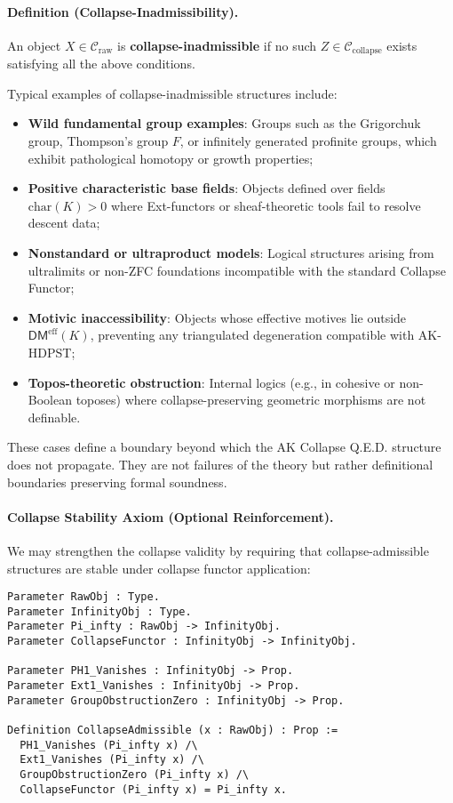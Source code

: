\documentclass[11pt]{article}
\begin{document}
\paragraph{Definition (Collapse-Inadmissibility).}

An object \( X \in \mathcal{C}_{\mathrm{raw}} \) is \textbf{collapse-inadmissible} if no such \( Z \in \mathcal{C}_{\mathrm{collapse}} \) exists satisfying all the above conditions.

Typical examples of collapse-inadmissible structures include:

\begin{itemize}
  \item \textbf{Wild fundamental group examples}: Groups such as the Grigorchuk group, Thompson’s group \( F \), or infinitely generated profinite groups, which exhibit pathological homotopy or growth properties;
  \item \textbf{Positive characteristic base fields}: Objects defined over fields \( \mathrm{char}(K) > 0 \) where Ext-functors or sheaf-theoretic tools fail to resolve descent data;
  \item \textbf{Nonstandard or ultraproduct models}: Logical structures arising from ultralimits or non-ZFC foundations incompatible with the standard Collapse Functor;
  \item \textbf{Motivic inaccessibility}: Objects whose effective motives lie outside \( \mathsf{DM}^{\mathrm{eff}}(K) \), preventing any triangulated degeneration compatible with AK-HDPST;
  \item \textbf{Topos-theoretic obstruction}: Internal logics (e.g., in cohesive or non-Boolean toposes) where collapse-preserving geometric morphisms are not definable.
\end{itemize}

These cases define a boundary beyond which the AK Collapse Q.E.D. structure does not propagate. They are not failures of the theory but rather definitional boundaries preserving formal soundness.

\paragraph{Collapse Stability Axiom (Optional Reinforcement).}

We may strengthen the collapse validity by requiring that collapse-admissible structures are stable under collapse functor application:

\begin{lstlisting}[language=Coq, caption=Collapse Stability Axiom]
Parameter RawObj : Type.
Parameter InfinityObj : Type.
Parameter Pi_infty : RawObj -> InfinityObj.
Parameter CollapseFunctor : InfinityObj -> InfinityObj.

Parameter PH1_Vanishes : InfinityObj -> Prop.
Parameter Ext1_Vanishes : InfinityObj -> Prop.
Parameter GroupObstructionZero : InfinityObj -> Prop.

Definition CollapseAdmissible (x : RawObj) : Prop :=
  PH1_Vanishes (Pi_infty x) /\
  Ext1_Vanishes (Pi_infty x) /\
  GroupObstructionZero (Pi_infty x) /\
  CollapseFunctor (Pi_infty x) = Pi_infty x.
\end{lstlisting}
\end{document}
